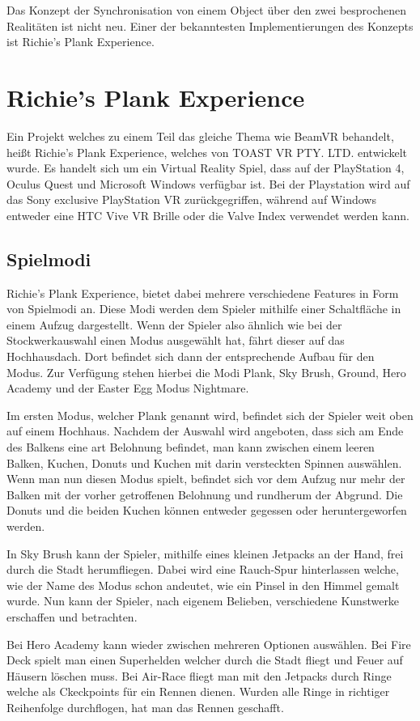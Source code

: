 Das Konzept der Synchronisation von einem Object über den zwei besprochenen Realitäten ist nicht neu.
Einer der bekanntesten Implementierungen des Konzepts ist Richie's Plank Experience.

\section{Richie's Plank Experience}
Ein Projekt welches zu einem Teil das gleiche Thema wie BeamVR behandelt, heißt Richie's Plank Experience, welches von TOAST VR PTY. LTD. entwickelt wurde.
Es handelt sich um ein Virtual Reality Spiel, dass auf der PlayStation 4, Oculus Quest und Microsoft Windows verfügbar ist.
Bei der Playstation wird auf das Sony exclusive PlayStation VR zurückgegriffen, während auf Windows entweder eine HTC Vive VR Brille oder die Valve Index verwendet werden kann.

\subsection{Spielmodi}
Richie's Plank Experience, bietet dabei mehrere verschiedene Features in Form von Spielmodi an.
Diese Modi werden dem Spieler mithilfe einer Schaltfläche in einem Aufzug dargestellt.
Wenn der Spieler also ähnlich wie bei der Stockwerkauswahl einen Modus ausgewählt hat, fährt dieser auf das Hochhausdach.
Dort befindet sich dann der entsprechende Aufbau für den Modus.
Zur Verfügung stehen hierbei die Modi Plank, Sky Brush, Ground, Hero Academy und der Easter Egg Modus Nightmare.

Im ersten Modus, welcher Plank genannt wird, befindet sich der Spieler weit oben auf einem Hochhaus.
Nachdem der Auswahl wird angeboten, dass sich am Ende des Balkens eine art Belohnung befindet, man kann zwischen einem leeren Balken, Kuchen, Donuts und Kuchen mit darin versteckten Spinnen auswählen.
Wenn man nun diesen Modus spielt, befindet sich vor dem Aufzug nur mehr der Balken mit der vorher getroffenen Belohnung und rundherum der Abgrund.
Die Donuts und die beiden Kuchen können entweder gegessen oder heruntergeworfen werden.

In Sky Brush kann der Spieler, mithilfe eines kleinen Jetpacks an der Hand, frei durch die Stadt herumfliegen.
Dabei wird eine Rauch-Spur hinterlassen welche, wie der Name des Modus schon andeutet, wie ein Pinsel in den Himmel gemalt wurde.
Nun kann der Spieler, nach eigenem Belieben, verschiedene Kunstwerke erschaffen und betrachten.

Bei Hero Academy kann wieder zwischen mehreren Optionen auswählen.
Bei Fire Deck spielt man einen Superhelden welcher durch die Stadt fliegt und Feuer auf Häusern löschen muss.
Bei Air-Race fliegt man mit den Jetpacks durch Ringe welche als Ckeckpoints für ein Rennen dienen.
Wurden alle Ringe in richtiger Reihenfolge durchflogen, hat man das Rennen geschafft.

